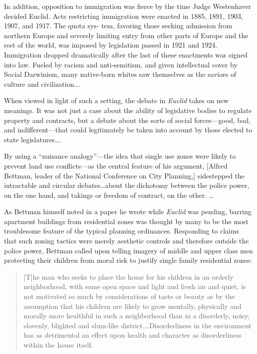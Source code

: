 In addition, opposition to immigration was fierce by the time Judge Westenhaver
decided Euclid. Acts restricting immigration were enacted in 1885, 1891, 1903,
1907, and 1917. The quota sys- tem, favoring those seeking admission from
northern Europe and severely limiting entry from other parts of Europe and the
rest of the world, was imposed by legislation passed in 1921 and 1924.
Immigration dropped dramatically after the last of these enactments was signed
into law. Fueled by racism and anti-semitism, and given intellectual cover by
Social Darwinism, many native-born whites saw themselves as the saviors of
culture and civilization\ldots .

When viewed in light of such a setting, the debate in \textit{Euclid} takes on
new meanings. It was not just a case about the ability of legislative bodies to
regulate property and contracts, but a debate about the sorts of social
forces---good, bad, and indifferent---that could legitimately be taken into
account by those elected to state legislatures\ldots .

By using a ``nuisance analogy''---the idea that single use zones were likely to
prevent land use conflicts---as the central feature of his argument, [Alfred
Bettman, leader of the National Conference on City Planning,] sidestepped the
intractable and circular debates\ldots about the dichotomy between the police
power, on the one hand, and takings or freedom of contract, on the other. \ldots

As Bettman himself noted in a paper he wrote while \textit{Euclid} was pending,
barring apartment buildings from residential zones was thought by many to be the
most troublesome feature of the typical planning ordinances. Responding to
claims that such zoning tactics were merely aesthetic controls and therefore
outside the police power, Bettman called upon telling imagery of middle and
upper class men protecting their children from moral risk to justify single
family residential zones:
\begin{quote}
[T]he man who seeks to place the home for his children in an orderly
neighborhood, with some open space and light and fresh air and quiet, is not
motivated so much by considerations of taste or beauty as by the assumption that
his children are likely to grow mentally, physically and morally more healthful
in such a neighborhood than in a disorderly, noisy, slovenly, blighted and
slum-like district.\ldots Disorderliness in the environment has as detrimental
an effect upon health and character as disorderliness within the house itself.
\end{quote}

